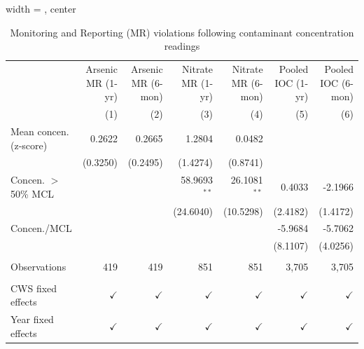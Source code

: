 
\begin{table}[htbp]
\caption{Monitoring and Reporting (MR) violations following contaminant concentration readings}\label{tab:mr_concentration_lag}
\centering
\begin{adjustbox}{width = \textwidth, center}
   \begin{tabular}{lrrrrrr}
      \toprule    
                                       & Arsenic MR (1-yr) & Arsenic MR (6-mon)  & Nitrate MR (1-yr) & Nitrate MR (6-mon)  & Pooled IOC (1-yr) & Pooled IOC (6-mon) \\   
                                       & (1)               & (2)                 & (3)               & (4)                 & (5)               & (6)\\  
      \midrule 
      Mean concen. (z-score)                    & 0.2622            & 0.2665              & 1.2804            & 0.0482              &                   &   \\   
                                       & (0.3250)          & (0.2495)            & (1.4274)          & (0.8741)            &                   &   \\   
      Concen. $>$ 50\% MCL                        &                   &                     & 58.9693$^{**}$    & 26.1081$^{**}$      & 0.4033            & -2.1966\\   
                                       &                   &                     & (24.6040)         & (10.5298)           & (2.4182)          & (1.4172)\\   
      Concen./MCL                            &                   &                     &                   &                     & -5.9684           & -5.7062\\   
                                       &                   &                     &                   &                     & (8.1107)          & (4.0256)\\   
       \\
      Observations                     & 419               & 419                 & 851               & 851                 & 3,705             & 3,705\\  
       \\
      CWS fixed effects              & $\checkmark$      & $\checkmark$        & $\checkmark$      & $\checkmark$        & $\checkmark$      & $\checkmark$\\   
      Year fixed effects               & $\checkmark$      & $\checkmark$        & $\checkmark$      & $\checkmark$        & $\checkmark$      & $\checkmark$\\   

\end{tabular}
\end{adjustbox}
\end{table}
